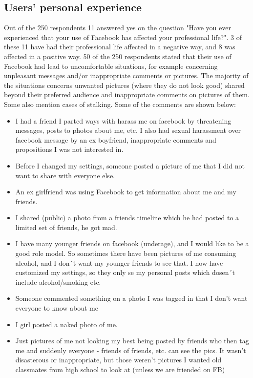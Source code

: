 \subsection{Users' personal experience}
Out of the 250 respondents 11 answered yes on the question "Have you ever experienced that your use of Facebook has affected your professional life?". 3 of these 11 have had their professional life affected in a negative way, and 8 was affected in a positive way. 
50 of the 250 respondents stated that their use of Facebook had lead to uncomfortable situations, for example concerning unpleasant messages and/or inappropriate comments or pictures. The majority of the situations concerns unwanted pictures (where they do not look good) shared beyond their preferred audience and inappropriate comments on pictures of them. Some also mention cases of stalking. Some of the comments are shown below:

\begin{itemize} 
\item I had a friend I parted ways with harass me on facebook by threatening messages, posts to photos about me, etc. I also had sexual harassment over facebook message by an ex boyfriend, inappropriate comments and propositions I was not interested in.
\item Before I changed my settings, someone posted a picture of me that I did not want to share with everyone else.
\item An ex girlfriend was using Facebook to get information about me and my friends.
\item I shared (public) a photo from a friends timeline which he had posted to a limited set of friends, he got mad.
\item I have many younger friends on facebook (underage), and I would like to be a good role model. So sometimes there have been pictures of me consuming alcohol, and I don´t want my younger friends to see that. I now have customized my settings, so they only se my personal posts which dosen´t include alcohol/smoking etc.
\item Someone commented something on a photo I was tagged in that I don't want everyone to know about me
\item I girl posted a naked photo of me.
\item Just pictures of me not looking my best being posted by friends who then tag me and suddenly everyone - friends of friends, etc. can see the pics. It wasn't disasterous or inappropriate, but those weren't pictures I wanted old classmates from high school to look at (unless we are friended on FB)
\end{itemize}

